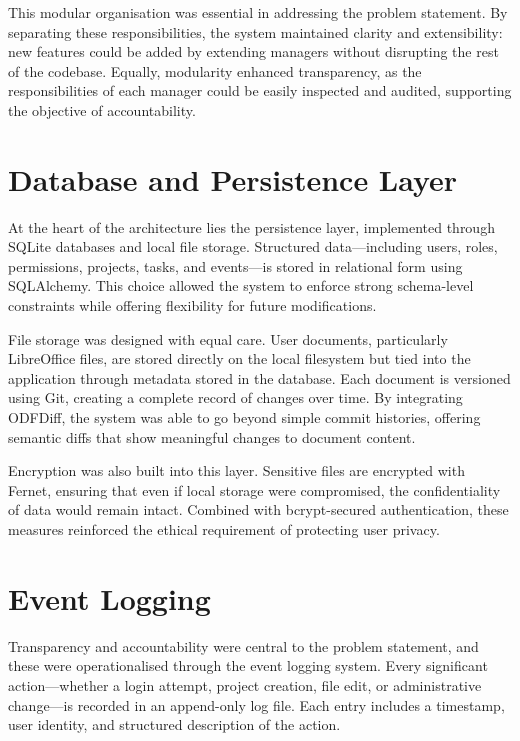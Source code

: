 \documentclass{report}
\begin{document}
This modular organisation was essential in addressing the problem statement. By separating these responsibilities, the system maintained clarity and extensibility: new features could be added by extending managers without disrupting the rest of the codebase. Equally, modularity enhanced transparency, as the responsibilities of each manager could be easily inspected and audited, supporting the objective of accountability.

\section{Database and Persistence Layer}

At the heart of the architecture lies the persistence layer, implemented through SQLite databases and local file storage. Structured data—including users, roles, permissions, projects, tasks, and events—is stored in relational form using SQLAlchemy. This choice allowed the system to enforce strong schema-level constraints while offering flexibility for future modifications.

File storage was designed with equal care. User documents, particularly LibreOffice files, are stored directly on the local filesystem but tied into the application through metadata stored in the database. Each document is versioned using Git, creating a complete record of changes over time. By integrating ODFDiff, the system was able to go beyond simple commit histories, offering semantic diffs that show meaningful changes to document content.

Encryption was also built into this layer. Sensitive files are encrypted with Fernet, ensuring that even if local storage were compromised, the confidentiality of data would remain intact. Combined with bcrypt-secured authentication, these measures reinforced the ethical requirement of protecting user privacy.

\section{Event Logging}

Transparency and accountability were central to the problem statement, and these were operationalised through the event logging system. Every significant action—whether a login attempt, project creation, file edit, or administrative change—is recorded in an append-only log file. Each entry includes a timestamp, user identity, and structured description of the action.
\end{document}

